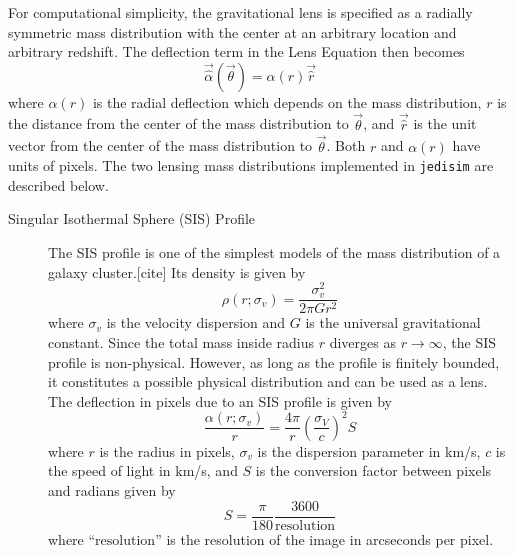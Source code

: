 \documentclass[10pt,twoside]{article}
\theoremstyle{definition}
\theoremstyle{exercise}
\begin{document}
For computational simplicity, the gravitational lens is specified as a radially symmetric mass distribution with the center at an arbitrary location and arbitrary redshift. The deflection term in the Lens Equation then becomes
\begin{equation}
  \vec{\hat{\alpha}}(\vec{\theta}) = \alpha(r) \vec{\hat{r}}
  \label{eq:rad_symm_lens_eq}
\end{equation}
where $\alpha(r)$ is the radial deflection which depends on the mass distribution, $r$ is the distance from the center of the mass distribution to $\vec{\theta}$, and $\vec{\hat{r}}$ is the unit vector from the center of the mass distribution to $\vec{\theta}$. Both $r$ and $\alpha(r)$ have units of pixels. The two lensing mass distributions implemented in \texttt{jedisim} are described below.
\begin{description}
  \item[Singular Isothermal Sphere (SIS) Profile] The SIS profile is one of the simplest models of the mass distribution of a galaxy cluster.[cite] Its density is given by
    \begin{equation}
      \rho(r; \sigma_v) = \frac{\sigma_v^2}{2\pi Gr^2}
      \label{eq:SIS_density}
    \end{equation}
    where $\sigma_v$ is the velocity dispersion and $G$ is the universal gravitational constant. Since the total mass inside radius $r$ diverges as $r \to \infty$, the SIS profile is non-physical. However, as long as the profile is finitely bounded, it constitutes a possible physical distribution and can be used as a lens. The deflection in pixels due to an SIS profile is given by 
    \begin{equation}
      \frac{\alpha(r; \sigma_v)}{r} = \frac{4\pi}{r}\left( \frac{\sigma_V}{c} \right)^2S
      \label{eq:SIS_deflection}
    \end{equation}
    where $r$ is the radius in pixels, $\sigma_v$ is the dispersion parameter in km/s, $c$ is the speed of light in km/s, and $S$ is the conversion factor between pixels and radians given by
    \begin{equation}
      S = \frac{\pi}{180}\frac{3600}{\text{resolution}}
      \label{eq:px_per_rad}
    \end{equation}
    where ``$\text{resolution}$'' is the resolution of the image in arcseconds per pixel.


\end{description}
\end{document}
